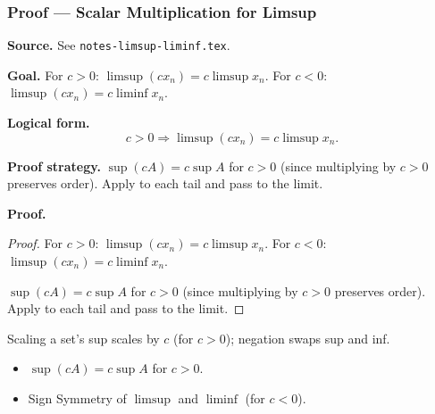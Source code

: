 
\clearpage
{}
\hypertarget{proof-RA-ABB-T-limsup-scalar}{}

\subsubsection[Scalar Multiplication for Limsup]{Proof --- Scalar Multiplication for Limsup}

\bigskip

\noindent
\textbf{Source.} See \texttt{notes-limsup-liminf.tex}.

\vspace{0.75em}

\noindent
\textbf{Goal.} For $c > 0$: $\limsup(c x_n) = c \limsup x_n$. For $c < 0$: $\limsup(c x_n) = c \liminf x_n$.

\vspace{0.75em}

\noindent
\textbf{Logical form.}
\[
  c > 0 \Rightarrow \limsup(cx_n) = c\limsup x_n.
\]

\vspace{0.75em}

\noindent
\textbf{Proof strategy.} $\sup(cA) = c \sup A$ for $c > 0$ (since multiplying by $c > 0$ preserves order). Apply to each tail and pass to the limit.

\vspace{0.75em}

\noindent
\textbf{Proof.}
\begin{proof}
\Claim For $c > 0$: $\limsup(c x_n) = c \limsup x_n$. For $c < 0$: $\limsup(c x_n) = c \liminf x_n$.

\Given 

\Goal 

\Strategy $\sup(cA) = c \sup A$ for $c > 0$ (since multiplying by $c > 0$ preserves order). Apply to each tail and pass to the limit.

\medskip


\end{proof}

\begin{remark*}
Scaling a set's sup scales by $c$ (for $c>0$); negation swaps sup and inf.
\end{remark*}

\begin{remark*}[Dependencies]
\begin{itemize}
  \item $\sup(cA) = c \sup A$ for $c > 0$.
  \item Sign Symmetry of $\limsup$ and $\liminf$ (for $c < 0$).
\end{itemize}
\end{remark*}

